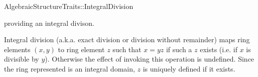 \begin{ccRefConcept}{AlgebraicStructureTraits::IntegralDivision}

\ccDefinition

 providing an integral divison. 

Integral division (a.k.a. exact division or division without remainder) maps 
ring elements $(x,y)$ to ring element $z$ such that $x = yz$ if such a $z$ 
exists (i.e. if $x$ is divisible by $y$). Otherwise the effect of invoking 
this operation is undefined. Since the ring represented is an integral domain, 
$z$ is uniquely defined if it exists. 

\ccRefines 


\ccTypes
{}

\ccOperations
{}


\ccSeeAlso


\end{ccRefConcept} 
